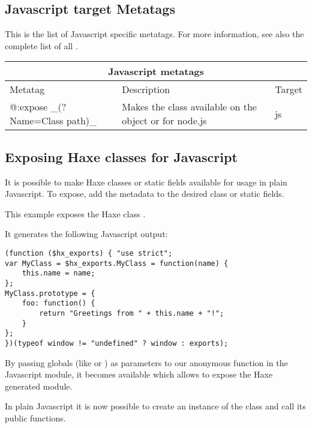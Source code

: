 \subsection{Javascript target Metatags}
\label{target-javascript-metatags}

This is the list of Javascript specific metatags. For more information, see also the complete list of all .

\begin{center}
\begin{tabular}{| l | l | l |}
	\hline
	\multicolumn{3}{|c|}{Javascript metatags} \\ \hline
	Metatag &  Description & Target \\ \hline
	@:expose \_(?Name=Class path)\_  &  Makes the class available on the \expr{window} object or \expr{exports} for node.js  & js  \\
\end{tabular}
\end{center}

\subsection{Exposing Haxe classes for Javascript}
\label{target-javascript-expose}

It is possible to make Haxe classes or static fields available for usage in plain Javascript. 
To expose, add the  metadata to the desired class or static fields.

This example exposes the Haxe class .


It generates the following Javascript output:

\begin{lstlisting}
(function ($hx_exports) { "use strict";
var MyClass = $hx_exports.MyClass = function(name) {
	this.name = name;
};
MyClass.prototype = {
	foo: function() {
		return "Greetings from " + this.name + "!";
	}
};
})(typeof window != "undefined" ? window : exports);
\end{lstlisting}

By passing globals (like  or ) as parameters to our anonymous function in the Javascript module, it becomes available which allows to expose the Haxe generated module.

In plain Javascript it is now possible to create an instance of the class and call its public functions.

